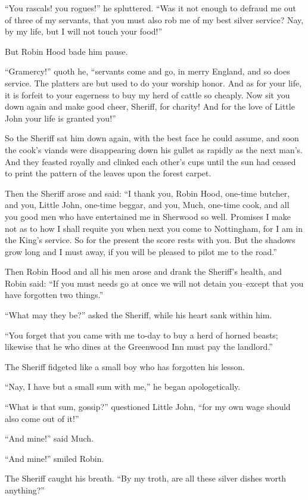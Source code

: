 ``You rascals! you rogues!'' he spluttered. ``Was it not enough to
defraud me out of three of my servants, that you must also rob me of my
best silver service? Nay, by my life, but I will not touch your food!''

But Robin Hood bade him pause.

``Gramercy!'' quoth he, ``servants come and go, in merry England, and so
does service. The platters are but used to do your worship honor. And as
for your life, it is forfeit to your eagerness to buy my herd of cattle
so cheaply. Now sit you down again and make good cheer, Sheriff, for
charity! And for the love of Little John your life is granted you!''

So the Sheriff sat him down again, with the best face he could assume,
and soon the cook's viands were disappearing down his gullet as rapidly
as the next man's. And they feasted royally and clinked each other's
cups until the sun had ceased to print the pattern of the leaves upon
the forest carpet.

Then the Sheriff arose and said: ``I thank you, Robin Hood, one-time
butcher, and you, Little John, one-time beggar, and you, Much, one-time
cook, and all you good men who have entertained me in Sherwood so well.
Promises I make not as to how I shall requite you when next you come to
Nottingham, for I am in the King's service. So for the present the score
rests with you. But the shadows grow long and I must away, if you will
be pleased to pilot me to the road.''

Then Robin Hood and all his men arose and drank the Sheriff's health,
and Robin said: ``If you must needs go at once we will not detain
you--except that you have forgotten two things.''

``What may they be?'' asked the Sheriff, while his heart sank within
him.

``You forget that you came with me to-day to buy a herd of horned
beasts; likewise that he who dines at the Greenwood Inn must pay the
landlord.''

The Sheriff fidgeted like a small boy who has forgotten his lesson.

``Nay, I have but a small sum with me,'' he began apologetically.

``What is that sum, gossip?'' questioned Little John, ``for my own wage
should also come out of it!''

``And mine!'' said Much.

``And mine!'' smiled Robin.

The Sheriff caught his breath. ``By my troth, are all these silver
dishes worth anything?''

